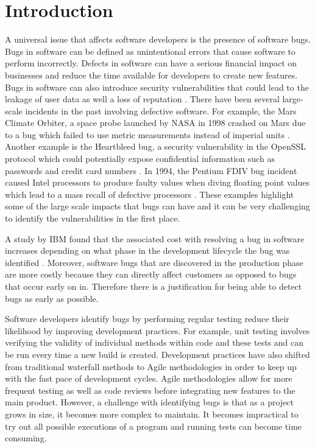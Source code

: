 \documentclass[../main.tex]{subfiles}
\begin{document}
\chapter{Introduction}

A universal issue that affects software developers is the presence of software bugs. Bugs in software can be defined as unintentional errors that cause software to perform incorrectly. Defects in software can have a serious financial impact on businesses and
reduce the time available for developers to create new features. Bugs in software can also introduce security vulnerabilities that could lead to the leakage of user data as well a loss of reputation \cite{briski2008minimizing}. There have been several large-scale incidents in the past involving defective software. For example, the Mars Climate Orbiter, a space probe launched by NASA in 1998 crashed on Mars due to a bug which failed to use metric measurements instead of imperial units \cite{sauser2009projects}. Another example is the Heartbleed bug, a security vulnerability in the OpenSSL protocol which could potentially expose confidential information such as passwords and credit card numbers \cite{durumeric2014matter}. In 1994, the Pentium FDIV bug incident caused Intel processors to produce faulty values when diving floating point values which lead to a mass recall of defective processors \cite{pratt1995anatomy}. These examples highlight some of the large scale impacts that bugs can have and it can be very challenging to identify the vulnerabilities in the first place. 

A study by IBM found that the associated cost with resolving a bug in software increases depending on what phase in the development lifecycle the bug was identified \cite{briski2008minimizing}. Moreover, software bugs that are discovered in the production phase are more costly because they can directly affect customers as opposed to bugs that occur early on in. Therefore there is a justification for being able to detect bugs as early as possible. 

Software developers identify bugs by performing regular testing reduce their likelihood by improving development practices. For example, unit testing involves verifying the validity of individual methods within code and these tests and can be run every time a new build is created. Development practices have also shifted from traditional waterfall methods to Agile methodologies in order to keep up with the fast pace of development cycles. Agile methodologies allow for more frequent testing as well as code reviews before integrating new features to the main product. However, a challenge with identifying bugs is that as a project grows in size, it becomes more complex to maintain. It becomes impractical to try out all possible executions of a program and running tests can become time consuming. 
\end{document}
